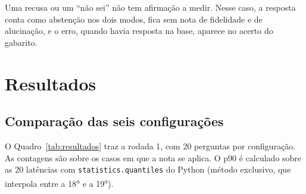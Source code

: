 \documentclass[11pt,a4paper]{article}
\newcommand{\codigo}[1]{\texttt{\small #1}}
\begin{document}
Uma recusa ou um ``não sei'' não tem afirmação a medir. Nesse caso, a resposta conta como abstenção nos dois modos, fica sem nota de fidelidade e de alucinação, e o erro, quando havia resposta na base, aparece no acerto do gabarito.

\section{Resultados}

\subsection{Comparação das seis configurações}

O Quadro~\ref{tab:resultados} traz a rodada 1, com 20 perguntas por configuração. As contagens são sobre os casos em que a nota se aplica. O p90 é calculado sobre as 20 latências com \codigo{statistics.quantiles} do Python (método exclusivo, que interpola entre a 18\textsuperscript{a} e a 19\textsuperscript{a}).
\end{document}
